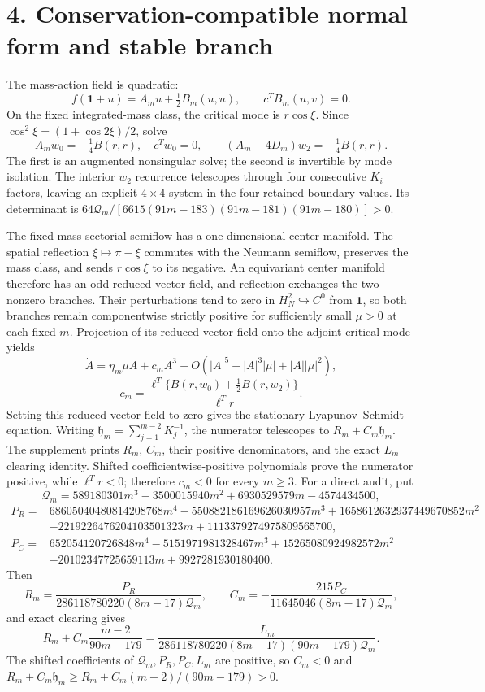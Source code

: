\documentclass[10pt]{article}
\begin{document}
\section*{4. Conservation-compatible normal form and stable branch}
The mass-action field is quadratic:
\[
f(\mathbf1+u)=A_mu+\tfrac12B_m(u,u),\qquad c^TB_m(u,v)=0.
\]
On the fixed integrated-mass class, the critical mode is $r\cos\xi$. Since $\cos^2\xi=(1+\cos2\xi)/2$, solve
\[
A_mw_0=-\tfrac14B(r,r),\quad c^Tw_0=0,
\qquad (A_m-4D_m)w_2=-\tfrac14B(r,r).
\]
The first is an augmented nonsingular solve; the second is invertible by mode
isolation.  The interior $w_2$ recurrence telescopes through four consecutive
$K_i$ factors, leaving an explicit $4\times4$ system in the four retained
boundary values.  Its determinant is
$64\mathcal Q_m/[6615(91m-183)(91m-181)(91m-180)]>0$.

The fixed-mass sectorial semiflow has a one-dimensional center manifold.
The spatial reflection $\xi\mapsto\pi-\xi$ commutes with the Neumann
semiflow, preserves the mass class, and sends $r\cos\xi$ to its negative.
An equivariant center manifold therefore has an odd reduced vector field, and
reflection exchanges the two nonzero branches.
Their perturbations tend to zero in $H_N^2\hookrightarrow C^0$ from
$\mathbf1$, so both branches remain componentwise strictly positive for
sufficiently small $\mu>0$ at each fixed $m$.
Projection of its reduced vector field onto the adjoint critical mode yields
\[
\dot A=\eta_m\mu A+c_mA^3+O(|A|^5+|A|^3|\mu|+|A||\mu|^2),
\]
\[
c_m=\frac{\ell^T\{B(r,w_0)+\tfrac12B(r,w_2)\}}{\ell^Tr}.
\]
Setting this reduced vector field to zero gives the stationary
Lyapunov--Schmidt equation.
Writing $\mathfrak h_m=\sum_{j=1}^{m-2}K_j^{-1}$, the numerator telescopes to
$R_m+C_m\mathfrak h_m$.  The supplement prints $R_m$, $C_m$, their positive
denominators, and the exact $L_m$ clearing identity.  Shifted
coefficientwise-positive polynomials prove the numerator positive, while
$\ell^Tr<0$; therefore $c_m<0$ for every $m\ge3$.
For a direct audit, put
\[
\mathcal Q_m=589180301m^3-3500015940m^2+6930529579m-4574434500,
\]
\begin{align*}
P_R={}&68605040480814208768m^4-550882186169626030957m^3
+1658612632937449670852m^2\\
&-2219226476204103501323m+1113379274975809565700,\\
P_C={}&652054120726848m^4-5151971981328467m^3
+15265080924982572m^2\\
&-20102347725659113m+9927281930180400.
\end{align*}
Then
\[
R_m=\frac{P_R}{286118780220(8m-17)\mathcal Q_m},\qquad
C_m=-\frac{215P_C}{11645046(8m-17)\mathcal Q_m},
\]
and exact clearing gives
\[
R_m+C_m\frac{m-2}{90m-179}
=\frac{L_m}{286118780220(8m-17)(90m-179)\mathcal Q_m}.
\]
The shifted coefficients of $\mathcal Q_m,P_R,P_C,L_m$ are positive, so
$C_m<0$ and
$R_m+C_m\mathfrak h_m\ge R_m+C_m(m-2)/(90m-179)>0$.
\end{document}
